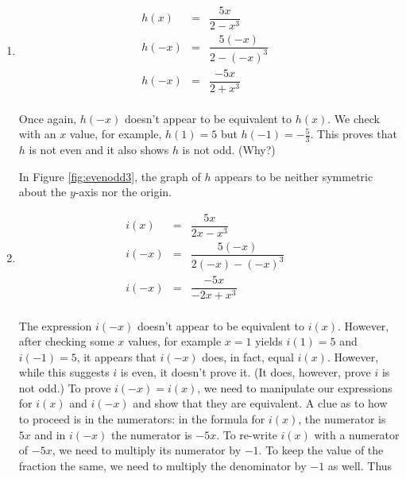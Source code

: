 {\begin{enumerate}
\[\begin{array}{rclr}
- g(x) & = & - \dfrac{5x}{2 - x^2} & \\ 
& = &  \dfrac{-5x}{2 - x^2} & \\  
-g(x) & = & g(-x) & \\  

\end{array} \]
Hence, $g$ is odd: see Figure \ref{fig:evenodd2}.


\item  \[ \begin{array}{rclr}   

h(x) & = & \dfrac{5x}{2 - x^3} & \\ 
h(-x) & = & \dfrac{5(-x)}{2 - (-x)^3} & \\  
h(-x) & = & \dfrac{-5x}{2 + x^3} & \\  

\end{array} \]

\setlength{\extrarowheight}{2pt}

Once again, $h(-x)$ doesn't appear to be equivalent to $h(x)$.  We check with an $x$ value, for example, $h(1) = 5$ but $h(-1) = -\frac{5}{3}$.  This proves that $h$ is not even and it also shows $h$ is not odd. (Why?)  


In Figure \ref{fig:evenodd3}, the graph of $h$ appears to be neither symmetric about the $y$-axis nor the origin.

\setlength{\extrarowheight}{8pt}

\item  \[ \begin{array}{rclr}   

i(x) & = & \dfrac{5x}{2x - x^3} & \\ 
i(-x) & = & \dfrac{5(-x)}{2(-x) - (-x)^3} & \\ 
i(-x) & = & \dfrac{-5x}{-2x + x^3} & \\  

\end{array} \]

\setlength{\extrarowheight}{2pt}

The expression  $i(-x)$ doesn't appear to be equivalent to $i(x)$.  However, after checking some $x$ values, for example $x=1$ yields $i(1) = 5$ and $i(-1 )= 5$, it appears that $i(-x)$ does, in fact, equal $i(x)$.  However, while this suggests  $i$ is even, it doesn't prove it.  (It does, however, prove $i$ is not odd.)  To prove $i(-x) = i(x)$, we need to manipulate our expressions for $i(x)$ and $i(-x)$ and show that they are equivalent.  A clue as to how to proceed is in the numerators: in the formula for $i(x)$, the numerator is $5x$ and in $i(-x)$ the numerator is $-5x$.  To re-write $i(x)$ with a numerator of $-5x$, we need to multiply its numerator by $-1$.  To keep the value of the fraction the same, we need to multiply the denominator by $-1$ as well.  Thus


\end{enumerate}}
